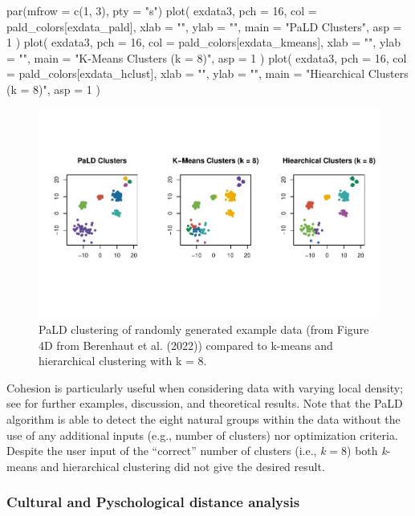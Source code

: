 \begin{Schunk}
\begin{Sinput}
par(mfrow = c(1, 3), pty = "s")
plot(
  exdata3,
  pch = 16,
  col = pald_colors[exdata_pald],
  xlab = "",
  ylab = "",
  main = "PaLD Clusters",
  asp = 1
)
plot(
  exdata3,
  pch = 16,
  col = pald_colors[exdata_kmeans],
  xlab = "",
  ylab = "",
  main = "K-Means Clusters (k = 8)",
  asp = 1
)
plot(
  exdata3,
  pch = 16,
  col = pald_colors[exdata_hclust],
  xlab = "",
  ylab = "",
  main = "Hiearchical Clusters (k = 8)",
  asp = 1
)
\end{Sinput}
\begin{figure}
\includegraphics{dagostino-mcgowan_files/figure-latex/fig5-1} \caption[PaLD clustering of randomly generated example data (from Figure 4D from Berenhaut et al]{PaLD clustering of randomly generated example data (from Figure 4D from Berenhaut et al. (2022)) compared to k-means and hierarchical clustering with k = 8.}\label{fig:fig5}
\end{figure}
\end{Schunk}

Cohesion is particularly useful when considering data with varying local
density; see \citet{berenhaut2022social} for further examples,
discussion, and theoretical results. Note that the PaLD algorithm is
able to detect the eight natural groups within the data without the use
of any additional inputs (e.g., number of clusters) nor optimization
criteria. Despite the user input of the ``correct'' number of clusters
(i.e., \(k = 8\)) both \emph{k}-means and hierarchical clustering did
not give the desired result.

\hypertarget{cultural-and-pyschological-distance-analysis}{%
\subsubsection{Cultural and Pyschological distance
analysis}\label{cultural-and-pyschological-distance-analysis}}

